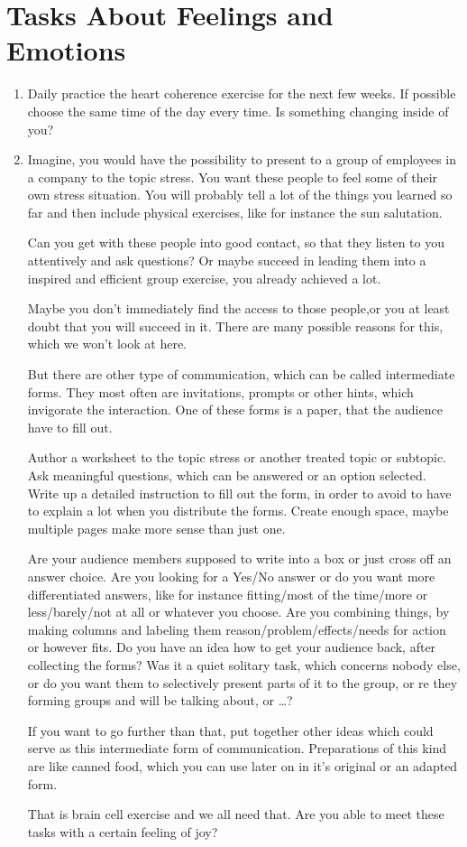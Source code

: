 \documentclass[../main.tex]{subfiles}
\begin{document}
\section[Tasks]{Tasks About Feelings and Emotions}

  \begin{enumerate}[label = \Alph*]
  \item Daily practice the heart coherence exercise for the next few weeks.
    If possible choose the same time of the day every time.
    Is something changing inside of you?
  \item Imagine, you would have the possibility to present to a group of employees in a company to the topic stress.
    You want these people to feel some of their own stress situation.
    You will probably tell a lot of the things you learned so far and then include physical exercises, like for instance the sun salutation.

    Can you get with these people into good contact, so that they listen to you attentively and ask questions?
    Or maybe succeed in leading them into a inspired and efficient group exercise, you already achieved a lot.

    Maybe you don't immediately find the access to those people,or you at least doubt that you will succeed in it.
    There are many possible reasons for this, which we won't look at here.

    But there are other type of communication, which can be called intermediate forms.
    They most often are invitations, prompts or other hints, which invigorate the interaction.
    One of these forms is a paper, that the audience have to fill out.

    Author a worksheet to the topic stress or another treated topic or subtopic.
    Ask meaningful questions, which can be answered or an option selected.
    Write up a detailed instruction to fill out the form, in order to avoid to have to explain a lot when you distribute the forms.
    Create enough space, maybe multiple pages make more sense than just one.

    Are your audience members supposed to write into a box or just cross off an answer choice.
    Are you looking for a Yes/No answer or do you want more differentiated answers, like for instance fitting/most of the time/more or less/barely/not at all or whatever you choose.
    Are you combining things, by making columns and labeling them reason/problem/effects/needs for action or however fits.
    Do you have an idea how to get your audience back, after collecting the forms?
    Was it a quiet solitary task, which concerns nobody else, or do you want them to selectively present parts of it to the group, or re they forming groups and will be talking about, or \ldots?

    If you want to go further than that, put together other ideas which could serve as this intermediate form of communication.
    Preparations of this kind are like canned food, which you can use later on in it's original or an adapted form.
    
    That is brain cell exercise and we all need that.
    Are you able to meet these tasks with a certain feeling of joy?
\end{enumerate}
\end{document}
